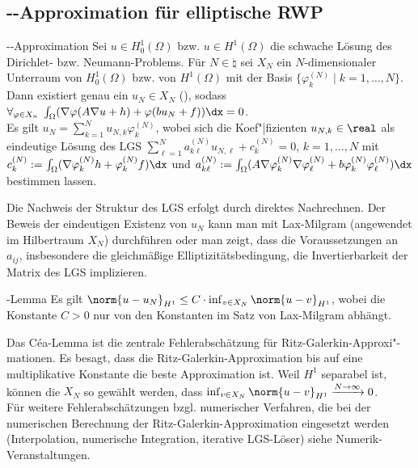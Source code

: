 \subsection{%
    --Approximation für elliptische RWP%
}

\begin{Satz}{--Approximation}
    Sei $u \in H^1_0(\Omega)$ bzw. $u \in H^1(\Omega)$ die schwache Lösung des
    Dirichlet- bzw. Neumann-Problems.
    Für $N \in \natural$ sei $X_N$ ein $N$-dimensionaler
    Unterraum von $H_0^1(\Omega)$ bzw. von $H^1(\Omega)$
    mit der Basis $\{\varphi_k^{(N)} \;|\; k = 1, \dotsc, N\}$.\\
    Dann existiert genau ein $u_N \in X_N$
    (), sodass\\
    $\forall_{\varphi \in X_n}\;
    \int_\Omega (\nabla \varphi (A \nabla u + h) + \varphi(bu_N + f))\dx = 0$.\\
    Es gilt $u_N = \sum_{k=1}^N u_{N,k} \varphi_k^{(N)}$,
    wobei sich die Koef"|fizienten $u_{N,k} \in \real$ als eindeutige Lösung des LGS
    $\sum_{\ell=1}^N a_{k\ell}^{(N)} u_{N,\ell} + c_k^{(N)} = 0$, $k = 1, \dotsc, N$ mit
    $c_k^{(N)} := \int_\Omega (\nabla \varphi_k^{(N)} h + \varphi_k^{(N)} f)\dx$ und
    $a_{k\ell}^{(N)} := \int_\Omega (A \nabla \varphi_k^{(N)} \nabla \varphi_\ell^{(N)} + b\varphi_k^{(N)} \varphi_\ell^{(N)}) \dx$
    bestimmen lassen.
\end{Satz}

\begin{Bem}
    Die Nachweis der Struktur des LGS erfolgt durch direktes Nachrechnen.
    Der Beweis der eindeutigen Existenz von $u_N$ kann man mit Lax-Milgram
    (angewendet im Hilbertraum $X_N$) durchführen
    oder man zeigt, dass die Voraussetzungen an $a_{ij}$,
    insbesondere die gleichmäßige Elliptizitätsbedingung,
    die Invertierbarkeit der Matrix des LGS implizieren.
\end{Bem}

\linie

\begin{Lemma}{-Lemma}
    Es gilt $\norm{u - u_N}_{H^1} \le C \cdot \inf_{v \in X_N} \norm{u - v}_{H^1}$,
    wobei die Konstante $C > 0$ nur von den Konstanten im Satz von Lax-Milgram abhängt.
\end{Lemma}

\begin{Bem}
    Das Céa-Lemma ist die zentrale Fehlerabschätzung für Ritz-Galerkin-Approxi"-mationen.
    Es besagt, dass die Ritz-Galerkin-Approximation bis auf eine multiplikative Konstante
    die beste Approximation ist.
    Weil $H^1$ separabel ist, können die $X_N$ so gewählt werden, dass
    $\inf_{v \in X_N} \norm{u - v}_{H^1} \xrightarrow{N \to \infty} 0$.\\
    Für weitere Fehlerabschätzungen bzgl. numerischer Verfahren, die bei der numerischen Berechnung
    der Ritz-Galerkin-Approximation eingesetzt werden
    (Interpolation, numerische Integra\-tion, iterative LGS-Löser) siehe Numerik-Veranstaltungen.
\end{Bem}

\pagebreak
